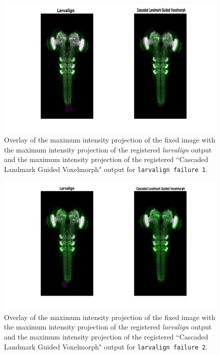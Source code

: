 \documentclass{book}
\begin{document}
	\begin{figure}[h!]
		\centering
		\includegraphics[width=0.9\columnwidth]{resources/chapter7/LRE_Visual/failure1.pdf}
		\caption{Overlay of the maximum intensity projection of the fixed image with the maximum intensity projection of the registered \textit{larvalign} output and the maximum intensity projection of the registered ``Cascaded Landmark Guided Voxelmorph" output for \texttt{larvalign failure 1}.}
		\label{fig:larvalign failure 1}
	\end{figure}
	
	\begin{figure}[h!]
		\centering
		\includegraphics[width=0.9\columnwidth]{resources/chapter7/LRE_Visual/failure2.pdf}
		\caption{Overlay of the maximum intensity projection of the fixed image with the maximum intensity projection of the registered \textit{larvalign} output and the maximum intensity projection of the registered ``Cascaded Landmark Guided Voxelmorph" output for \texttt{larvalign failure 2}.}
		\label{fig:larvalign failure 2}
	\end{figure}
\end{document}

